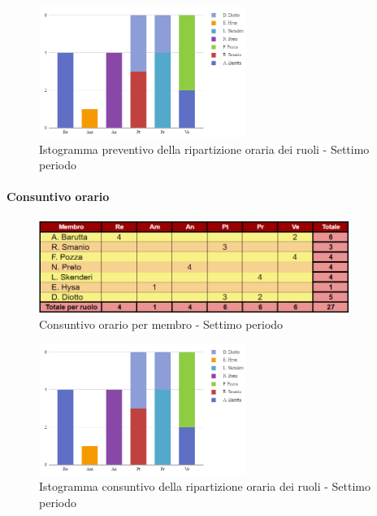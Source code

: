 \vspace{0.6cm}

\begin{figure}[H]
    \centering
    \includegraphics[width=0.6\textwidth]{../Images/preventivoDivisioneRuoli7Periodo.png}
    \caption{Istogramma preventivo della ripartizione oraria dei ruoli - Settimo periodo}
    \label{fig:Preventivo_ripartizione_oraria_7}
\end{figure}

\pagebreak

\paragraph{Consuntivo orario}

\begin{figure}[H]
    \centering
    \includegraphics[width=0.9\textwidth]{../Images/consuntivoOrario7Periodo.png}
    \caption{Consuntivo orario per membro - Settimo periodo}
    \label{fig:Constuntivo_orario_7}
\end{figure}

\vspace{0.6cm}

\begin{figure}[H]
    \centering
    \includegraphics[width=0.6\textwidth]{../Images/consuntivoDivisioneRuoli7Periodo.png}
    \caption{Istogramma consuntivo della ripartizione oraria dei ruoli - Settimo periodo}
    \label{fig:Consuntivo_ripartizione_oraria_7}
\end{figure}